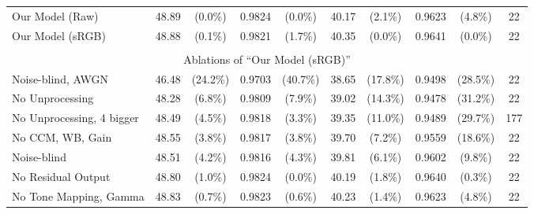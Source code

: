 \documentclass[10pt,twocolumn,letterpaper]{article}
\begin{document}
\begin{table*}[]
\begin{center}
{\begin{tabular}{ l || cc|cc || cc|cc || c }
Our Model (Raw)     &  \cellcolor{Red} 48.89 & \cellcolor{Red} (0.0\%) & \cellcolor{Red} 0.9824 & \cellcolor{Red} (0.0\%) & \cellcolor{Orange} 40.17 & \cellcolor{Orange} (2.1\%) & \cellcolor{Orange} 0.9623 & \cellcolor{Orange} (4.8\%) & 22 \\
Our Model (sRGB)    &  \cellcolor{Orange} 48.88 & \cellcolor{Orange} (0.1\%) & \cellcolor{Orange} 0.9821 & \cellcolor{Orange} (1.7\%) & \cellcolor{Red} 40.35 & \cellcolor{Red} (0.0\%) & \cellcolor{Red} 0.9641 & \cellcolor{Red} (0.0\%) & 22 \\


%
 \multicolumn{10}{c}{} \\
\multicolumn{10}{c}{Ablations of ``Our Model (sRGB)''} \\
\hline


Noise-blind, AWGN  &   46.48 &  (24.2\%) &  0.9703 &  (40.7\%) &  38.65 &  (17.8\%) &  0.9498 &  (28.5\%) & 22\\
No Unprocessing  &   48.28 &  (6.8\%) &  0.9809 &  (7.9\%) &  39.02 &  (14.3\%) &  0.9478 &  (31.2\%) & 22\\
No Unprocessing, 4 bigger &  48.49 &  (4.5\%) &  0.9818 &  (3.3\%) &  39.35 &  (11.0\%) &  0.9489 &  (29.7\%) & 177 \\
No CCM, WB, Gain  &   48.55 &  (3.8\%) &  0.9817 &  (3.8\%) &  39.70 &  (7.2\%) &  0.9559 &  (18.6\%) & 22\\
Noise-blind  &   48.51 &  (4.2\%) &  0.9816 &  (4.3\%) &  39.81 &  (6.1\%) &  0.9602 &  (9.8\%) & 22\\
No Residual Output  &   48.80 &  (1.0\%) &  0.9824 &  (0.0\%) &  40.19 &  (1.8\%) &  0.9640 &  (0.3\%) & 22\\
No Tone Mapping, Gamma &   48.83 &  (0.7\%) &  0.9823 &  (0.6\%) &  40.23 &  (1.4\%) &  0.9623 &  (4.8\%) & 22\\



\end{tabular}}
\end{center}
\end{table*}
\end{document}
